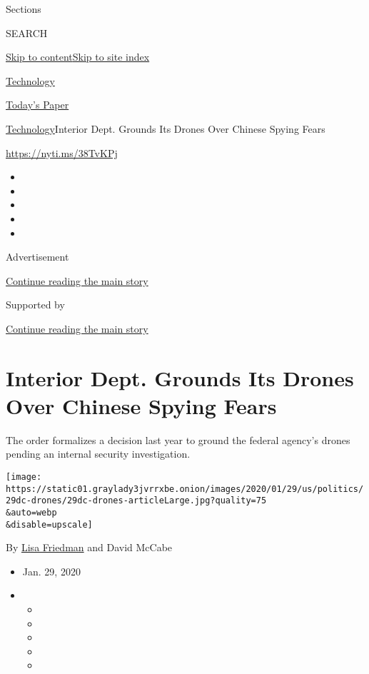 Sections

SEARCH

\protect\hyperlink{site-content}{Skip to
content}\protect\hyperlink{site-index}{Skip to site index}

\href{https://www.nytimes3xbfgragh.onion/section/technology}{Technology}

\href{https://myaccount.nytimes3xbfgragh.onion/auth/login?response_type=cookie\&client_id=vi}{}

\href{https://www.nytimes3xbfgragh.onion/section/todayspaper}{Today's
Paper}

\href{/section/technology}{Technology}\textbar{}Interior Dept. Grounds
Its Drones Over Chinese Spying Fears

\url{https://nyti.ms/38TvKPj}

\begin{itemize}
\item
\item
\item
\item
\item
\end{itemize}

Advertisement

\protect\hyperlink{after-top}{Continue reading the main story}

Supported by

\protect\hyperlink{after-sponsor}{Continue reading the main story}

\hypertarget{interior-dept-grounds-its-drones-over-chinese-spying-fears}{%
\section{Interior Dept. Grounds Its Drones Over Chinese Spying
Fears}\label{interior-dept-grounds-its-drones-over-chinese-spying-fears}}

The order formalizes a decision last year to ground the federal agency's
drones pending an internal security investigation.

\texttt{[image: https://static01.graylady3jvrrxbe.onion/images/2020/01/29/us/politics/29dc-drones/29dc-drones-articleLarge.jpg?quality=75\\\&auto=webp\\\&disable=upscale]}

By \href{https://www.nytimes3xbfgragh.onion/by/lisa-friedman}{Lisa
Friedman} and David McCabe

\begin{itemize}
\item
  Jan. 29, 2020
\item
  \begin{itemize}
  \item
  \item
  \item
  \item
  \item
  \end{itemize}
\end{itemize}

